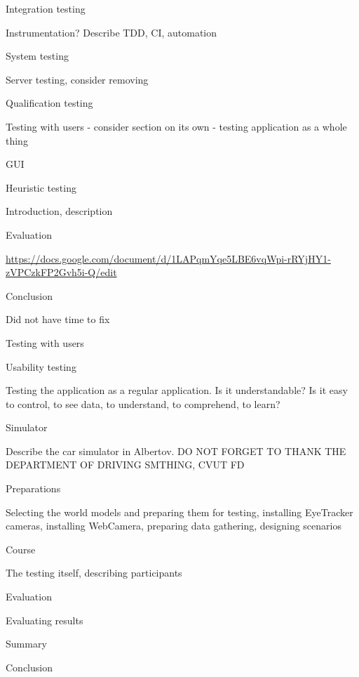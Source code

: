 \secc Integration testing

Instrumentation? Describe TDD, CI, automation

\secc System testing

Server testing, consider removing

\secc Qualification testing

Testing with users - consider section on its own - testing application as a whole thing

\sec GUI


\secc Heuristic testing

Introduction, description

\seccc Evaluation

\url{https://docs.google.com/document/d/1LAPqmYqe5LBE6vqWpi-rRYjHY1-zVPCzkFP2Gvh5i-Q/edit}

\seccc Conclusion

Did not have time to fix

\secc Testing with users


\seccc Usability testing

Testing the application as a regular application. Is it understandable? Is it easy to control, to see data, to understand, to comprehend, to learn?


\seccc Simulator

Describe the car simulator in Albertov.
DO NOT FORGET TO THANK THE DEPARTMENT OF DRIVING SMTHING, CVUT FD


\seccc Preparations

Selecting the world models and preparing them for testing, installing EyeTracker cameras, installing WebCamera, preparing data gathering, designing scenarios

\seccc Course

The testing itself, describing participants

\seccc Evaluation

Evaluating results

\sec Summary


\chap Conclusion



